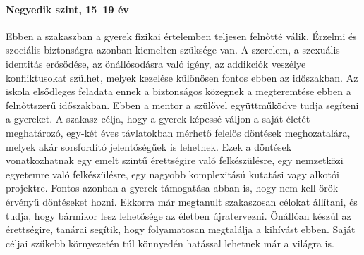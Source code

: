 \paragraph{Negyedik szint, 15--19 év} Ebben a szakaszban a gyerek fizikai
értelemben teljesen felnőtté válik. Érzelmi és szociális biztonságra azonban kiemelten szüksége van. A szerelem, a szexuális identitás erősödése, az önállósodásra való igény, az addikciók veszélye konfliktusokat szülhet, melyek kezelése különösen fontos ebben az időszakban. Az iskola elsődleges feladata ennek a biztonságos közegnek a megteremtése ebben a felnőttszerű időszakban. Ebben a mentor a szülővel együttműködve tudja segíteni a gyereket. A szakasz célja, hogy a gyerek képessé váljon a saját életét meghatározó, egy-két éves távlatokban mérhető felelős döntések meghozatalára, melyek akár sorsfordító jelentőségűek is lehetnek. Ezek a döntések  vonatkozhatnak egy emelt szintű érettségire való felkészülésre, egy nemzetközi egyetemre való felkészülésre, egy nagyobb komplexitású kutatási vagy alkotói projektre. Fontos azonban a gyerek támogatása abban is, hogy nem kell örök érvényű döntéseket hozni. Ekkorra már megtanult szakaszosan célokat állítani, és tudja, hogy bármikor lesz lehetősége az életben újratervezni. Önállóan készül az érettségire, tanárai segítik, hogy folyamatosan megtalálja a kihívást ebben. Saját céljai szűkebb környezetén túl könnyedén hatással lehetnek már a világra is.
